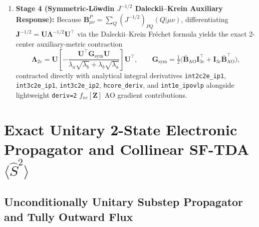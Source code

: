 \documentclass[10pt]{article}
\theoremstyle{natthm}
\newcommand{\Ssq}{\langle\hat{S}^2\rangle}
\begin{document}
\begin{enumerate}
  \item \textbf{Stage 4 (Symmetric-L\"owdin $J^{-1/2}$ Daleckii--Krein Auxiliary Response):} Because $\mathbf{B}_{\mu\nu}^P = \sum_Q (J^{-1/2})_{PQ}(Q|\mu\nu)$, differentiating $\mathbf{J}^{-1/2} = \mathbf{U}\mathbf{\Lambda}^{-1/2}\mathbf{U}^\top$ via the Daleckii--Krein Fr\'echet formula\cite{daleckii1956} yields the exact 2-center auxiliary-metric contraction
  \begin{equation}
    \mathbf{\Lambda}_{2c} = \mathbf{U}\!\left[-\frac{\mathbf{U}^\top \mathbf{G}_{\mathrm{sym}}\mathbf{U}}{\lambda_a\sqrt{\lambda_b} + \lambda_b\sqrt{\lambda_a}}\right]\!\mathbf{U}^\top, \qquad
    \mathbf{G}_{\mathrm{sym}} = \tfrac{1}{2}\bigl(\bar{\mathbf{B}}_{\mathrm{AO}}\mathbf{I}_{3c}^\top + \mathbf{I}_{3c}\bar{\mathbf{B}}_{\mathrm{AO}}^\top\bigr),
  \end{equation}
  contracted directly with analytical integral derivatives \texttt{int2c2e\_ip1}, \texttt{int3c2e\_ip1}, \texttt{int3c2e\_ip2}, \texttt{hcore\_deriv}, and \texttt{int1e\_ipovlp} alongside lightweight \texttt{deriv=2} $f_{xc}[\mathbf{Z}]$ AO gradient contributions.
\end{enumerate}

\section{Exact Unitary 2-State Electronic Propagator and Collinear SF-TDA \texorpdfstring{$\Ssq$}{<S2>}}

\subsection{Unconditionally Unitary Substep Propagator and Tully Outward Flux}
\end{document}
